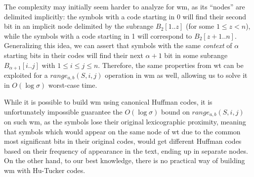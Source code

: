The complexity may initially seem harder to analyze for \gls{wm}, as its ``nodes'' are delimited implicitly: the symbols with a code starting in 0 will find their second bit in an implicit node delimited by the subrange $B_2[1..z]$ (for some $1 \leq z < n$), while the symbols with a code starting in 1 will correspond to $B_2[z+1..n]$. Generalizing this idea, we can assert that symbols with the same \textit{context} of $\alpha$ starting bits in their codes will find their next $\alpha+1$ bit in some subrange $B_{\alpha+1}[i..j]$ with $1 \leq i \leq j \leq n$. Therefore, the same properties from \gls{wt} can be exploited for a $range_{a,b}(S,i,j)$ operation in \gls{wm} as well, allowing us to solve it in $O(\log\sigma)$ worst-case time.

While it is possible to build \gls{wm} using canonical Huffman codes, it is unfortunately impossible guarantee the $O(\log\sigma)$ bound on $range_{a,b}(S,i,j)$ on such \gls{wm}, as the symbols lose their original lexicographic proximity, meaning that symbols which would appear on the same node of \gls{wt} due to the common most significant bits in their original codes, would get different Huffman codes based on their frequency of appearance in the text, ending up in separate nodes. On the other hand, to our best knowledge, there is no practical way of building \gls{wm} with Hu-Tucker codes.


